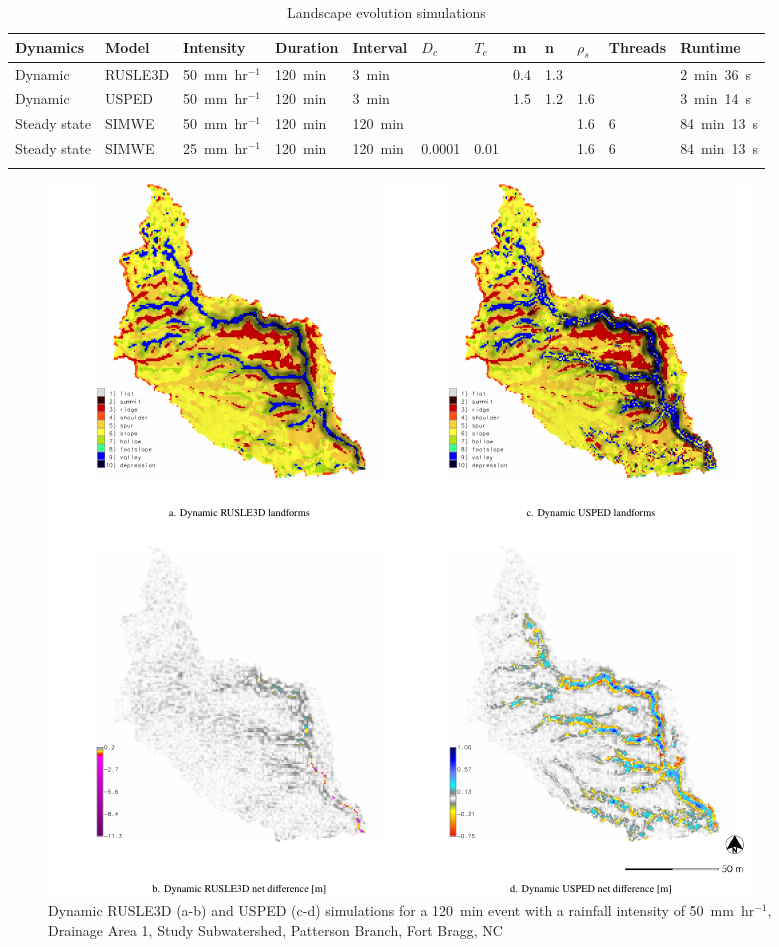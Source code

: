 \documentclass[gmd, manuscript]{copernicus}
\begin{document}
\begin{table}
\small
\caption{Landscape evolution simulations}
\begin{tabu} to \textwidth {XXXXXllllllX}
\toprule
Dynamics & Model & Intensity & Duration & Interval & $D_c$ & $T_c$ & m & n & $\rho_s$ & Threads & Runtime\\
\midrule
Dynamic & RUSLE3D & 50~\unit{mm~hr}$^{-1}$ & 120~\unit{min} & 3~\unit{min} &  &  & 0.4 & 1.3 & & & 2~\unit{min}~36~\unit{s}\\
Dynamic & USPED & 50~\unit{mm~hr}$^{-1}$ & 120~\unit{min} & 3~\unit{min} &  &  & 1.5 & 1.2 & 1.6 & & 3~\unit{min}~14~\unit{s}\\
Steady state & SIMWE & 50~\unit{mm~hr}$^{-1}$ & 120~\unit{min} & 120~\unit{min} & & & & & 1.6 & 6 & 84~\unit{min}~13~\unit{s}\\
Steady state & SIMWE & 25~\unit{mm~hr}$^{-1}$ & 120~\unit{min} & 120~\unit{min} & 0.0001 & 0.01 & & & 1.6 & 6 & 84~\unit{min}~13~\unit{s}\\
\bottomrule
\\
\end{tabu}
\label{table:simulations} 
\end{table}


\begin{figure}
\center
\includegraphics[width=\textwidth,height=0.925\textheight,keepaspectratio]{figures/simulations.pdf}
\caption{Dynamic RUSLE3D (a-b) and USPED (c-d) simulations
for a 120~\unit{min} event with a rainfall intensity of 50~\unit{mm~hr}$^{-1}$,\\
Drainage Area 1, Study Subwatershed, Patterson Branch, Fort Bragg, NC}
\label{fig:simulations}
\end{figure}
\end{document}
